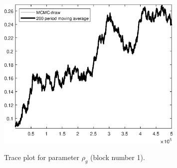 \begin{figure}[H]
\centering
  \includegraphics[width=0.8\textwidth]{BRS_growth_ext_shopping/graphs/TracePlot_rho_g_blck_1}\\
    \caption{Trace plot for parameter ${\rho_g}$ (block number 1).}
\end{figure}
